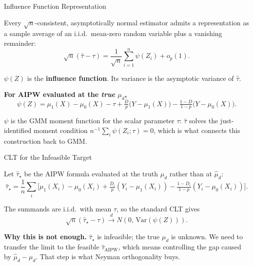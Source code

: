 \documentclass[aspectratio=169, handout, t]{beamer}
\begin{document}
\begin{frame}{Influence Function Representation}

Every $\sqrt n$-consistent, asymptotically normal estimator admits a representation as a sample average of an i.i.d.\ mean-zero random variable plus a vanishing remainder:
$$\sqrt n (\hat\tau - \tau) = \frac{1}{\sqrt n}\sum_{i=1}^n \psi(Z_i) + o_p(1).$$

$\psi(Z)$ is the \textbf{influence function}.  Its variance is the asymptotic variance of $\hat\tau$.

\medskip
\textbf{For AIPW evaluated at the \emph{true} $\mu_d$,}
$$\psi(Z) = \mu_1(X) - \mu_0(X) - \tau + \tfrac{D}{p}\big(Y - \mu_1(X)\big) - \tfrac{1-D}{1-p}\big(Y - \mu_0(X)\big).$$

\medskip
$\psi$ is the GMM moment function for the scalar parameter $\tau$: $\hat\tau$ solves the just-identified moment condition $n^{-1}\sum_i \psi(Z_i;\tau) = 0$, which is what connects this construction back to GMM.

\end{frame}

\begin{frame}{CLT for the Infeasible Target}

Let $\hat\tau_\star$ be the AIPW formula evaluated at the truth $\mu_d$ rather than at $\hat\mu_d$:
$$\hat\tau_\star = \frac{1}{n}\sum_i \big[\mu_1(X_i) - \mu_0(X_i) + \tfrac{D_i}{p}(Y_i - \mu_1(X_i)) - \tfrac{1-D_i}{1-p}(Y_i - \mu_0(X_i))\big].$$

\medskip
The summands are i.i.d.\ with mean $\tau$, so the standard CLT gives
$$\boxed{\sqrt n (\hat\tau_\star - \tau) \xrightarrow{d} N(0,\, \mathrm{Var}(\psi(Z))).}$$

\medskip
\textbf{Why this is not enough.}  $\hat\tau_\star$ is infeasible; the true $\mu_d$ is unknown.  We need to transfer the limit to the feasible $\hat\tau_{\mathrm{AIPW}}$, which means controlling the gap caused by $\hat\mu_d - \mu_d$.  That step is what Neyman orthogonality buys.

\end{frame}
\end{document}
